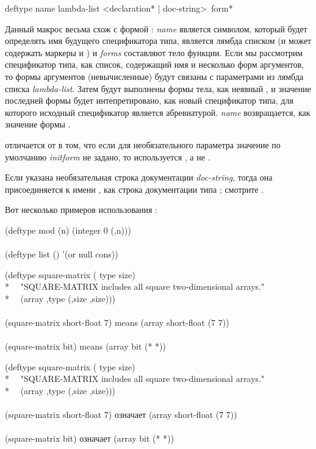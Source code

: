 \begin{defmac}
deftype name lambda-list <{declaration}* | doc-string> {\,form}*

Данный макрос весьма схож с формой : \emph{name} является
символом, который будет определять имя будущего спецификатора типа,
 является лямбда списком (и может содержать маркеры  и
) и \emph{forms} составляют тело функции. Если мы рассмотрим
спецификатор типа, как список, содержащий имя и несколько форм аргументов, то
формы аргументов (невычисленные) будут связаны с параметрами из лямбда списка
\emph{lambda-list}. Затем будут выполнены формы тела, как неявный ,
и значение последней формы будет интепретировано, как новый спецификатор типа,
для которого исходный спецификатор является абревиатурой. \emph{name}
возвращается, как значение формы .

 отличается от  в том, что если для необязательного 
параметра значение по умолчанию \emph{initform} не задано, то используется
\cdf{*}, а не {\nil}.

Если указана необязательная строка документации \emph{doc-string}, тогда она
присоединяется к имени , как строка документации типа ;
смотрите .

Вот несколько примеров использования :
\begin{lisp}
(deftype mod (n) {\Xbq}(integer 0 (,n))) \\
 \\
(deftype list () '(or null cons))
\end{lisp}

\begin{lisp}
(deftype square-matrix ( type size) \\*
~~"SQUARE-MATRIX includes all square two-dimensional arrays." \\*
~~{\Xbq}(array ,type (,size ,size))) \\
 \\
(square-matrix short-float 7)  \textrm{means}  (array short-float (7 7)) \\
 \\
(square-matrix bit)  \textrm{means}  (array bit (* *))
\end{lisp}

\begin{lisp}
(deftype square-matrix ( type size) \\*
~~"SQUARE-MATRIX includes all square two-dimensional arrays." \\*
~~{\Xbq}(array ,type (,size ,size))) \\
 \\
(square-matrix short-float 7)  \textrm{означает}  (array short-float (7 7)) \\
 \\
(square-matrix bit)  \textrm{означает}  (array bit (* *))
\end{lisp}


\end{defmac}
